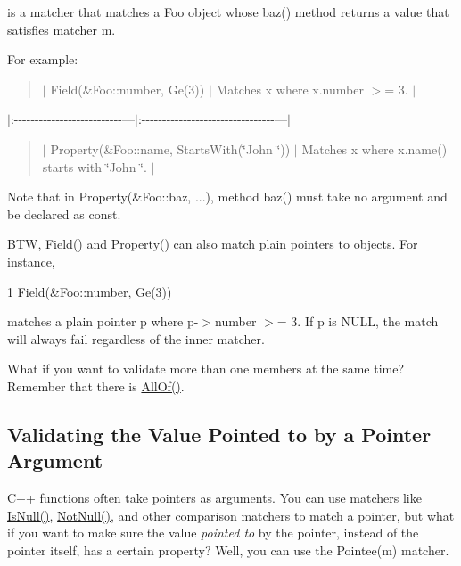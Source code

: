 is a matcher that matches a {\ttfamily Foo} object whose {\ttfamily baz()} method returns a value that satisfies matcher {\ttfamily m}.

For example\+:

\begin{quote}
$\vert$ {\ttfamily Field(\&\+Foo\+::number, Ge(3))} $\vert$ Matches {\ttfamily x} where {\ttfamily x.\+number $>$= 3}. $\vert$ \end{quote}
$\vert$\+:-\/-\/-\/-\/-\/-\/-\/-\/-\/-\/-\/-\/-\/-\/-\/-\/-\/-\/-\/-\/-\/-\/-\/-\/-\/-\/---$\vert$\+:-\/-\/-\/-\/-\/-\/-\/-\/-\/-\/-\/-\/-\/-\/-\/-\/-\/-\/-\/-\/-\/-\/-\/-\/-\/-\/-\/-\/-\/-\/-\/-\/---$\vert$ \begin{quote}
$\vert$ {\ttfamily Property(\&Foo\+::name, Starts\+With(\char`\"{}\+John \char`\"{}))} $\vert$ Matches {\ttfamily x} where {\ttfamily x.\+name()} starts with {\ttfamily \char`\"{}\+John \char`\"{}}. $\vert$ \end{quote}


Note that in {\ttfamily Property(\&Foo\+::baz, ...)}, method {\ttfamily baz()} must take no argument and be declared as {\ttfamily const}.

B\+TW, {\ttfamily \hyperlink{namespacetesting_a4df3849391696aa93ac3a7703a717c2a}{Field()}} and {\ttfamily \hyperlink{namespacetesting_a0fad10571e23f7bc0d5c83d4c31ba740}{Property()}} can also match plain pointers to objects. For instance,


\begin{DoxyCode}
1 Field(&Foo::number, Ge(3))
\end{DoxyCode}


matches a plain pointer {\ttfamily p} where {\ttfamily p-\/$>$number $>$= 3}. If {\ttfamily p} is {\ttfamily N\+U\+LL}, the match will always fail regardless of the inner matcher.

What if you want to validate more than one members at the same time? Remember that there is {\ttfamily \hyperlink{namespacetesting_af7618e8606c1cb45738163688944e2b7}{All\+Of()}}.

\subsection*{Validating the Value Pointed to by a Pointer Argument}

C++ functions often take pointers as arguments. You can use matchers like {\ttfamily \hyperlink{namespacetesting_a56ffb1a169c14ce585fc5bed32add2db}{Is\+Null()}}, {\ttfamily \hyperlink{namespacetesting_a39d1f92b53b8b2a0b6db6a22ac146416}{Not\+Null()}}, and other comparison matchers to match a pointer, but what if you want to make sure the value {\itshape pointed to} by the pointer, instead of the pointer itself, has a certain property? Well, you can use the {\ttfamily Pointee(m)} matcher.

